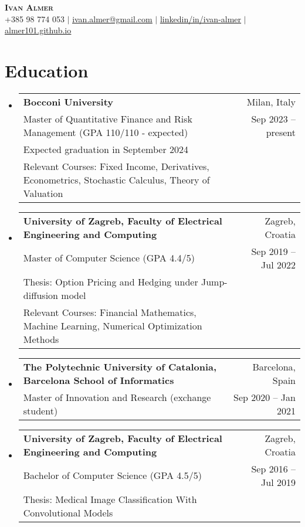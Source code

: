 \documentclass[letterpaper,11pt]{article}
\makeatletter
\newcommand{\resumeSubheading}[4]{
  \vspace{-2pt}\item
    \begin{tabular*}{0.97\textwidth}[t]{l@{\extracolsep{\fill}}r}
      \textbf{#1} & #2 \\
      \small #3 & \small #4 \\
    \end{tabular*}\vspace{-7pt}
}
\newcommand{\resumeSubheadingWithAdditional}[6]{
  \vspace{-2pt}\item
    \begin{tabular*}{0.97\textwidth}[t]{l@{\extracolsep{\fill}}r}
      \textbf{#1} & #2 \\
      \small #3 & \small #4 \\
      \small #5 \\
      \small #6
    \end{tabular*}\vspace{-7pt}
}
\newcommand{\resumeSubheadingWithAdditionall}[5]{
  \vspace{-2pt}\item
    \begin{tabular*}{0.97\textwidth}[t]{l@{\extracolsep{\fill}}r}
      \textbf{#1} & #2 \\
      \small #3 & \small #4 \\
      \small #5
    \end{tabular*}\vspace{-7pt}
}
\newcommand{\resumeSubHeadingListStart}{\begin{itemize}[leftmargin=0.15in, label={}]}
\newcommand{\resumeSubHeadingListEnd}{\end{itemize}}
\makeatother
\begin{document}

\begin{center}
    \textbf{\Huge \scshape Ivan Almer} \\ \vspace{2pt}
    \small +385 98 774 053 $|$ \href{mailto:ivan.almer@gmail.com}{\underline{ivan.almer@gmail.com}} $|$ 
    \href{https://linkedin.com/in/ivan-almer/}{\underline{linkedin/in/ivan-almer}} $|$
    \href{https://almer101.github.io/intro.html}{\underline{almer101.github.io}}
    
\end{center}



\section{Education}
  \resumeSubHeadingListStart
    \resumeSubheadingWithAdditional
      {Bocconi University}{Milan, Italy}
      {Master of Quantitative Finance and Risk Management (GPA 110/110 - expected)}{Sep 2023 -- present}{Expected graduation in September 2024}{Relevant Courses: Fixed Income, Derivatives, Econometrics, Stochastic Calculus, Theory of Valuation}
    \resumeSubheadingWithAdditional
      {University of Zagreb, Faculty of Electrical Engineering and Computing}{Zagreb, Croatia}
      {Master of Computer Science (GPA 4.4/5)}{Sep 2019 -- Jul 2022}{Thesis: Option Pricing and Hedging under Jump-diffusion model}
      {Relevant Courses: Financial Mathematics, Machine Learning, Numerical Optimization Methods}
    \resumeSubheading 
      {The Polytechnic University of Catalonia, Barcelona School of Informatics}{Barcelona, Spain}
      {Master of Innovation and Research (exchange student)}{Sep 2020 -- Jan 2021}
    \resumeSubheadingWithAdditionall
      {University of Zagreb, Faculty of Electrical Engineering and Computing}{Zagreb, Croatia}
      {Bachelor of Computer Science (GPA 4.5/5)}{Sep 2016 -- Jul 2019}{Thesis: Medical Image Classification With Convolutional Models}
  \resumeSubHeadingListEnd
\end{document}
